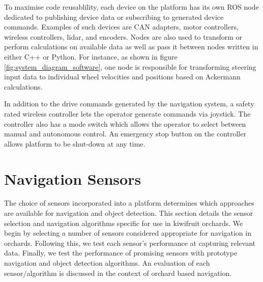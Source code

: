 \documentclass[preprint,authoryear,12pt]{elsarticle}
\begin{document}
        To maximise code reusablility, each device on the platform has its own ROS node dedicated to publishing device data or subscribing to generated device commands.
        Examples of such devices are CAN adapters, motor controllers, wireless controllers, lidar, and encoders.
        Nodes are also used to transform or perform calculations on available data as well as pass it between nodes written in either C++ or Python.
        For instance, as shown in figure \ref{fig:system_diagram_software}, one node is responsible for transforming steering input data to individual wheel velocities and positions based on Ackermann calculations.

        In addition to the drive commands generated by the navigation system, a safety rated wireless controller lets the operator generate commands via joystick.
        The controller also has a mode switch which allows the operator to select between manual and autonomous control.
        An emergency stop button on the controller allows platform to be shut-down at any time.


\section{Navigation Sensors}
\label{sect:sensors}
    The choice of sensors incorporated into a platform determines which approaches are available for navigation and object detection.
    This section details the sensor selection and navigation algorithms specific for use in kiwifruit orchards.
    We begin by selecting a number of sensors considered appropriate for navigation in orchards.
    Following this, we test each sensor's performance at capturing relevant data.
    Finally, we test the performance of promising sensors with prototype navigation and object detection algorithms.
    An evaluation of each sensor/algorithm is discussed in the context of orchard based navigation.
\end{document}
